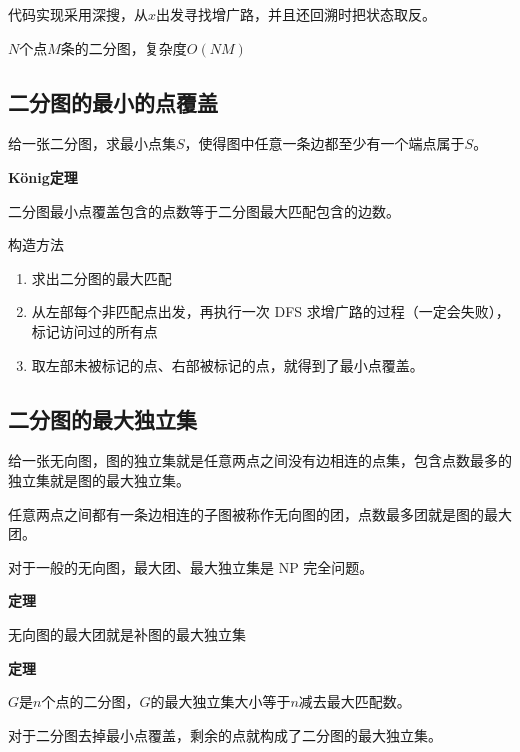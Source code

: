 代码实现采用深搜，从$x$出发寻找增广路，并且还回溯时把状态取反。

$N$个点$M$条的二分图，复杂度$O(NM)$



\subsection{二分图的最小的点覆盖}
给一张二分图，求最小点集$S$，使得图中任意一条边都至少有一个端点属于$S$。

\textbf{König定理}

二分图最小点覆盖包含的点数等于二分图最大匹配包含的边数。

构造方法
\begin{enumerate}
    \item 求出二分图的最大匹配
    \item 从左部每个非匹配点出发，再执行一次 DFS 求增广路的过程（一定会失败），标记访问过的所有点
    \item 取左部未被标记的点、右部被标记的点，就得到了最小点覆盖。
\end{enumerate}


\subsection{二分图的最大独立集}

给一张无向图，图的独立集就是任意两点之间没有边相连的点集，包含点数最多的独立集就是图的最大独立集。

任意两点之间都有一条边相连的子图被称作无向图的团，点数最多团就是图的最大团。

对于一般的无向图，最大团、最大独立集是 NP 完全问题。

\textbf{定理}

无向图的最大团就是补图的最大独立集

\textbf{定理}

$G$是$n$个点的二分图，$G$的最大独立集大小等于$n$减去最大匹配数。

对于二分图去掉最小点覆盖，剩余的点就构成了二分图的最大独立集。

